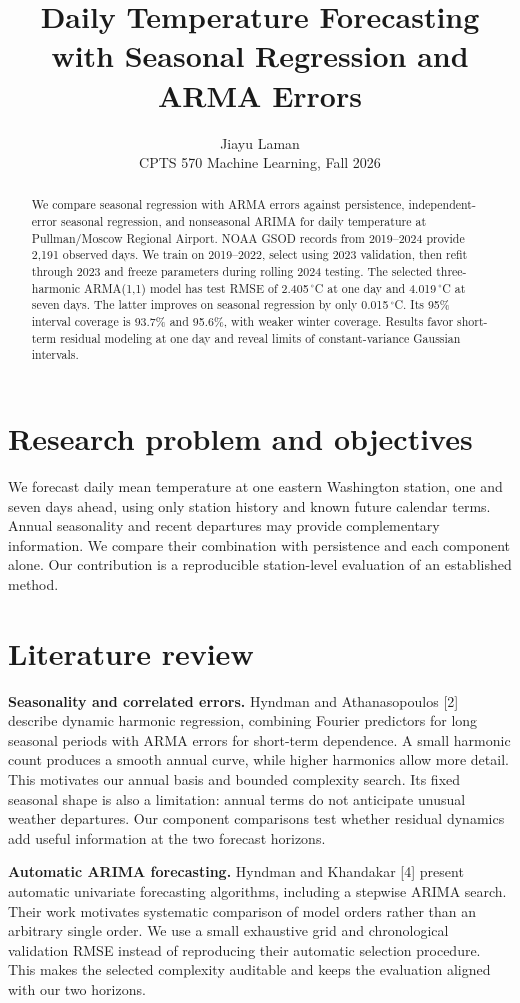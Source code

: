 \documentclass{article}
\title{Daily Temperature Forecasting\\with Seasonal Regression and ARMA Errors}
\author{Jiayu \qquad Laman\\CPTS 570 Machine Learning, Fall 2026}
\begin{document}
\maketitle
\begin{abstract}
We compare seasonal regression with ARMA errors against persistence, independent-
error seasonal regression, and nonseasonal ARIMA for daily temperature at
Pullman/Moscow Regional Airport. NOAA GSOD records from 2019--2024 provide
2,191 observed days. We train on 2019--2022, select using 2023 validation,
then refit through 2023 and freeze parameters during rolling 2024 testing.
The selected three-harmonic ARMA(1,1) model has test RMSE of 2.405\,$^\circ$C
at one day and 4.019\,$^\circ$C at seven days. The latter improves on seasonal
regression by only 0.015\,$^\circ$C. Its 95\% interval coverage is 93.7\% and
95.6\%, with weaker winter coverage. Results favor short-term residual modeling
at one day and reveal limits of constant-variance Gaussian intervals.
\end{abstract}

\section{Research problem and objectives}
We forecast daily mean temperature at one eastern Washington station, one and
seven days ahead, using only station history and known future calendar terms.
Annual seasonality and recent departures may provide complementary information. We compare their combination with persistence and each component alone.
Our contribution is a reproducible station-level evaluation of an established method.

\section*{Literature review}
\textbf{Seasonality and correlated errors.} Hyndman and Athanasopoulos [2]
describe dynamic harmonic regression, combining Fourier predictors for long
seasonal periods with ARMA errors for short-term dependence. A small harmonic
count produces a smooth annual curve, while higher harmonics allow more detail.
This motivates our annual basis and bounded complexity search. Its fixed
seasonal shape is also a limitation: annual terms do not anticipate unusual
weather departures. Our component comparisons test whether residual dynamics
add useful information at the two forecast horizons.

\textbf{Automatic ARIMA forecasting.} Hyndman and Khandakar [4] present
automatic univariate forecasting algorithms, including a stepwise ARIMA search.
Their work motivates systematic comparison of model orders rather than an
arbitrary single order. We use a small exhaustive grid and chronological
validation RMSE instead of reproducing their automatic selection procedure.
This makes the selected complexity auditable and keeps the evaluation aligned
with our two horizons.
\end{document}

